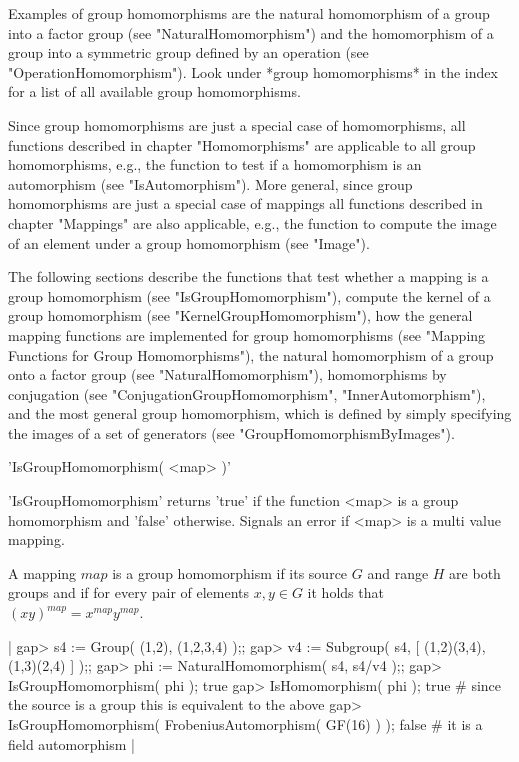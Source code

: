 Examples of group homomorphisms are the natural homomorphism  of  a group
into a factor group (see "NaturalHomomorphism") and the homomorphism of a
group    into  a symmetric    group    defined  by   an   operation  (see
"OperationHomomorphism").  Look under  *group homomorphisms* in the index
for a list of all available group homomorphisms.

Since group homomorphisms are just a special  case of  homomorphisms, all
functions  described in  chapter "Homomorphisms"  are  applicable to  all
group homomorphisms, e.g., the  function  to test if a homomorphism is an
automorphism  (see   "IsAutomorphism").   More   general,   since   group
homomorphisms are just a special case of mappings all functions described
in chapter "Mappings" are also applicable, e.g., the  function to compute
the image of an element under a group homomorphism (see "Image").

The following sections describe the functions that test whether a mapping
is a group homomorphism (see  "IsGroupHomomorphism"), compute the  kernel
of a group homomorphism (see "KernelGroupHomomorphism"), how the  general
mapping  functions are implemented for group homomorphisms (see  "Mapping
Functions for Group  Homomorphisms"), the natural homomorphism of a group
onto  a  factor  group  (see   "NaturalHomomorphism"),  homomorphisms  by
conjugation  (see  "ConjugationGroupHomomorphism",  "InnerAutomorphism"),
and the  most  general group  homomorphism,  which  is  defined by simply
specifying    the    images    of    a    set    of    generators    (see
"GroupHomomorphismByImages").

%

'IsGroupHomomorphism( <map> )'

'IsGroupHomomorphism' returns  'true'  if the function <map>  is  a group
homomorphism and 'false' otherwise.  Signals an error if <map> is a multi
value mapping.

A mapping $map$ is a group homomorphism  if its source $G$  and range $H$
are both groups and if  for every pair of elements $x, y \in  G$ it holds
that $(x y)^{map} = x^{map} y^{map}$.

|    gap> s4 := Group( (1,2), (1,2,3,4) );;
    gap> v4 := Subgroup( s4, [ (1,2)(3,4), (1,3)(2,4) ] );;
    gap> phi := NaturalHomomorphism( s4, s4/v4 );;
    gap> IsGroupHomomorphism( phi );
    true
    gap> IsHomomorphism( phi );
    true    # since the source is a group this is equivalent to the above
    gap> IsGroupHomomorphism( FrobeniusAutomorphism( GF(16) ) );
    false   # it is a field automorphism |

